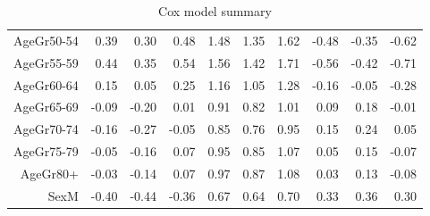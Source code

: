 \begin{table}[ht]
\begin{tabular}{rrrrrrrrrr}
  AgeGr50-54 & 0.39 & 0.30 & 0.48 & 1.48 & 1.35 & 1.62 & -0.48 & -0.35 & -0.62 \\ 
  AgeGr55-59 & 0.44 & 0.35 & 0.54 & 1.56 & 1.42 & 1.71 & -0.56 & -0.42 & -0.71 \\ 
  AgeGr60-64 & 0.15 & 0.05 & 0.25 & 1.16 & 1.05 & 1.28 & -0.16 & -0.05 & -0.28 \\ 
  AgeGr65-69 & -0.09 & -0.20 & 0.01 & 0.91 & 0.82 & 1.01 & 0.09 & 0.18 & -0.01 \\ 
  AgeGr70-74 & -0.16 & -0.27 & -0.05 & 0.85 & 0.76 & 0.95 & 0.15 & 0.24 & 0.05 \\ 
  AgeGr75-79 & -0.05 & -0.16 & 0.07 & 0.95 & 0.85 & 1.07 & 0.05 & 0.15 & -0.07 \\ 
  AgeGr80+ & -0.03 & -0.14 & 0.07 & 0.97 & 0.87 & 1.08 & 0.03 & 0.13 & -0.08 \\ 
  SexM & -0.40 & -0.44 & -0.36 & 0.67 & 0.64 & 0.70 & 0.33 & 0.36 & 0.30 \\ 
   \hline
\end{tabular}
\caption{Cox model summary} 
\end{table}
